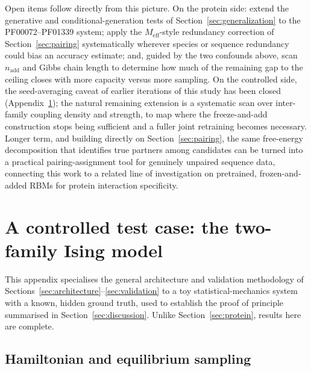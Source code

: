 \documentclass[11pt]{article}
\begin{document}
Open items follow directly from this picture. On the protein side: extend
the generative and conditional-generation tests of
Section~\ref{sec:generalization} to the PF00072--PF01339 system; apply the
$M_{\mathrm{eff}}$-style redundancy correction of
Section~\ref{sec:pairing} systematically wherever species or sequence
redundancy could bias an accuracy estimate; and, guided by the two
confounds above, scan $n_{\mathrm{add}}$ and Gibbs chain length to
determine how much of the remaining gap to the ceiling closes with more
capacity versus more sampling. On the controlled side, the seed-averaging
caveat of earlier iterations of this study has been closed
(Appendix~\ref{app:ising}); the natural remaining extension is a
systematic scan over inter-family coupling density and strength, to map
where the freeze-and-add construction stops being sufficient and a fuller
joint retraining becomes necessary. Longer term, and building directly on
Section~\ref{sec:pairing}, the same free-energy decomposition that
identifies true partners among candidates can be turned into a practical
pairing-assignment tool for genuinely unpaired sequence data, connecting
this work to a related line of investigation on pretrained,
frozen-and-added RBMs for protein interaction specificity.

\appendix

\section{A controlled test case: the two-family Ising model}
\label{app:ising}

This appendix specialises the general architecture and validation
methodology of Sections~\ref{sec:architecture}--\ref{sec:validation} to a
toy statistical-mechanics system with a known, hidden ground truth, used
to establish the proof of principle summarised in
Section~\ref{sec:discussion}. Unlike Section~\ref{sec:protein}, results
here are complete.

\subsection{Hamiltonian and equilibrium sampling}
\end{document}
